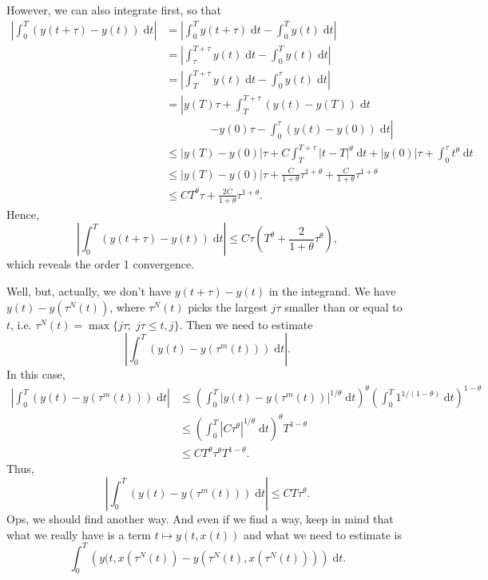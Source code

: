 \documentclass[reqno,12pt]{amsart}
\theoremstyle{plain}%
\theoremstyle{definition}
\begin{document}
However, we can also integrate first, so that
\begin{align*}
    \left|\int_0^T \left(y(t + \tau) - y(t) \right) \;\mathrm{d}t \right| & = \left|\int_0^T y(t + \tau) \;\mathrm{d}t - \int_0^T y(t) \;\mathrm{d}t \right| \\ 
    & = \left| \int_\tau^{T+\tau} y(t) \;\mathrm{d}t - \int_0^T y(t) \;\mathrm{d}t \right| \\
    & = \left| \int_T^{T+\tau} y(t) \;\mathrm{d}t - \int_0^\tau y(t) \;\mathrm{d}t \right| \\
    & = \left| y(T)\tau + \int_T^{T+\tau} (y(t) - y(T)) \;\mathrm{d}t \right. \\ 
    & \qquad\qquad \left. - y(0)\tau - \int_0^\tau (y(t) - y(0)) \;\mathrm{d}t \right| \\
    & \leq |y(T) - y(0)|\tau + C\int_T^{T+\tau} |t - T|^\theta \;\mathrm{d}t + |y(0)|\tau + \int_0^\tau t^\theta \;\mathrm{d}t \\
    & \leq |y(T) - y(0)|\tau + \frac{C}{1+\theta}\tau^{1+\theta} + \frac{C}{1+\theta}\tau^{1+\theta} \\
    & \leq CT^{\theta}\tau + \frac{2C}{1+\theta}\tau^{1+\theta}.
\end{align*}
Hence,
\[
    \left|\int_0^T \left(y(t + \tau) - y(t) \right) \;\mathrm{d}t \right| \leq C\tau \left(T^\theta + \frac{2}{1+\theta}\tau^\theta\right),
\]
which reveals the order 1 convergence.

Well, but, actually, we don't have $y(t+\tau) - y(t)$ in the integrand. We have $y(t) - y(\tau^N(t))$, where $\tau^N(t)$ picks the largest $j\tau$ smaller than or equal to $t$, i.e. $\tau^N(t) = \max\{j\tau; \; j\tau \leq t, j\}$.
Then we need to estimate
$$
\left|\int_0^T \left(y(t) - y(\tau^m(t)) \right) \;\mathrm{d}t \right|.
$$
In this case,
\begin{align*}
    \left|\int_0^T \left(y(t) - y(\tau^m(t)) \right) \;\mathrm{d}t \right| & \leq \left(\int_0^T \left|y(t) - y(\tau^m(t))\right|^{1/\theta} \;\mathrm{d}t \right)^\theta\left(\int_0^T 1^{1/(1-\theta)} \;\mathrm{d}t\right)^{1 - \theta} \\
    & \leq \left(\int_0^T \left|C\tau^\theta\right|^{1/\theta} \;\mathrm{d}t \right)^\theta T^{1 - \theta} \\
    & \leq CT^\theta \tau^\theta T^{1-\theta}.
\end{align*}
Thus,
\begin{equation}
    \left|\int_0^T \left(y(t) - y(\tau^m(t)) \right) \;\mathrm{d}t \right| \leq C T \tau^\theta.
\end{equation}
Ops, we should find another way. And even if we find a way, keep in mind that what we really have is a term $t \mapsto y(t, x(t))$ and what we need to estimate is
\[
    \int_0^T \left(y(t, x(\tau^N(t)) - y(\tau^N(t), x(\tau^N(t)))\right)\;\mathrm{d}t.
\]
\end{document}
